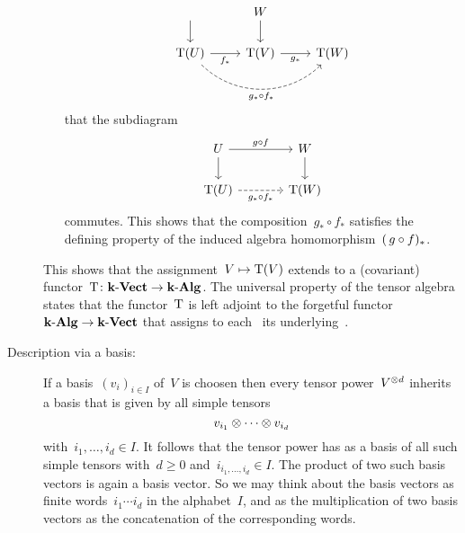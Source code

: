 \begin{recall}
\begin{description}
\begin{itemize}
\[\begin{tikzcd}
              \arrow{d}
              &
              W
              \arrow{d}
              \\
              \Tensor(U)
              \arrow{r}[below]{f_*}
              \arrow[dashed, bend right=45]{rr}[below]{g_* \circ f_*}
              &
              \Tensor(V)
              \arrow{r}[below]{g_*}
              &
              \Tensor(W)
            \end{tikzcd}
          \]
          that the subdiagram
          \[
            \begin{tikzcd}[column sep = large]
              U
              \arrow{r}[above]{g \circ f}
              \arrow{d}
              &
              W
              \arrow{d}
              \\
              \Tensor(U)
              \arrow[dashed]{r}[below]{g_* \circ f_*}
              &
              \Tensor(W)
            \end{tikzcd}
          \]
          commutes.
          This shows that the composition~$g_* \circ f_*$ satisfies the defining property of the induced algebra homomorphism~$(\, g \circ f)_*$.
      \end{itemize}
      
      This shows that the assignment~$V \mapsto \operatorname{T}(V)$ extends to a (covariant) functor~$\operatorname{T} \colon \mathbf{k}\text{-}\mathbf{Vect} \to \mathbf{k}\text{-}\mathbf{Alg}$.
      The universal property of the tensor algebra states that the functor~$\operatorname{T}$ is left adjoint to the forgetful functor~$\mathbf{k}\text{-}\mathbf{Alg} \to \mathbf{k}\text{-}\mathbf{Vect}$ that assigns to each~{\algebra{$\kf$}} its underlying~{\vectorspace{$\kf$}}.
    
    \item[Description via a basis:]
      If a basis~$(v_i)_{i \in I}$ of~$V$ is choosen then every tensor power~$V^{\otimes d}$ inherits a basis that is given by all simple tensors
      \[
        v_{i_1} \otimes \dotsb \otimes v_{i_d}
      \]
      with~$i_1, \dotsc, i_d \in I$.
      It follows that the tensor power has as a basis of all such simple tensors with~$d \geq 0$ and~$i_{i_1, \dotsc, i_d} \in I$.
      The product of two such basis vectors is again a basis vector.
      So we may think about the basis vectors as finite words~$i_1 \dotsm i_d$ in the alphabet~$I$, and as the multiplication of two basis vectors as the concatenation of the corresponding words.
      

\end{description}
\end{recall}
